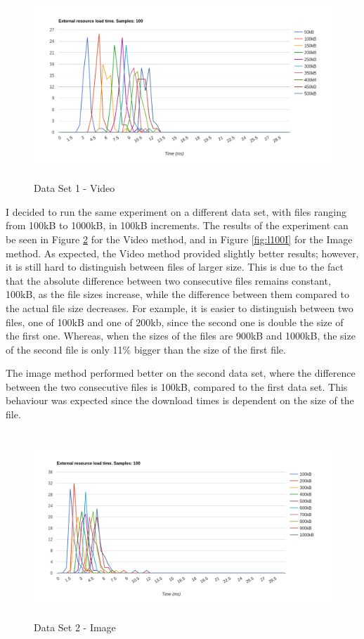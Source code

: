 \documentclass[10pt,a4paper,twoside]{book}
\begin{document}
\begin{figure}[h]
\centering
\includegraphics[width=\textwidth, height=7cm]{figures/v100L50H.png}
\caption{Data Set 1 - Video}
\label{fig:l50I}
\end{figure}

I decided to run the same experiment on a different data set, with files ranging from 100kB to 1000kB, in 100kB increments. The results of the experiment can be seen in Figure \ref{fig:l100V} for the Video method, and in Figure \ref{fig:l100I} for the Image method. As expected, the Video method provided slightly better results; however, it is still hard to distinguish between files of larger size. This is due to the fact that the absolute difference between two consecutive files remains constant, 100kB, as the file sizes increase, while the difference between them compared to the actual file size decreases. For example, it is easier to distinguish between two files, one of 100kB and one of 200kb, since the second one is double the size of the first one. Whereas, when the sizes of the files are 900kB and 1000kB, the size of the second file is only 11\% bigger than the size of the first file.

The image method performed better on the second data set, where the difference between the two consecutive files is 100kB, compared to the first data set. This behaviour was expected since the download times is dependent on the size of the file.

\begin{figure}[h]
\centering
\includegraphics[width=\textwidth, height=7cm]{figures/i100L100.png}
\caption{Data Set 2 - Image}
\label{fig:l100V}
\end{figure}
\end{document}
